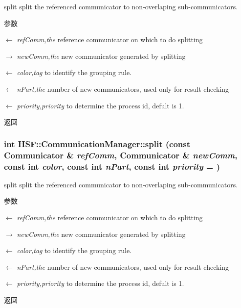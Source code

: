 split split the referenced communicator to non-\/overlaping sub-\/communicators. 
\begin{DoxyParams}{参数}
\item[\mbox{$\leftarrow$} {\em refComm,the}]reference communicator on which to do splitting \item[\mbox{$\rightarrow$} {\em newComm,the}]new communicator generated by splitting \item[\mbox{$\leftarrow$} {\em color,tag}]to identify the grouping rule. \item[\mbox{$\leftarrow$} {\em nPart,the}]number of new communicators, used only for result checking \item[\mbox{$\leftarrow$} {\em priority,priority}]to determine the process id, defult is 1. \end{DoxyParams}
\begin{DoxyReturn}{返回}

\end{DoxyReturn}
\hypertarget{classHSF_1_1CommunicationManager_ac7894dbdde04977f11fdbe954641d28e}{
\subsubsection[{split}]{\setlength{\rightskip}{0pt plus 5cm}int HSF::CommunicationManager::split (const {\bf Communicator} \& {\em refComm}, \/  {\bf Communicator} \& {\em newComm}, \/  const int {\em color}, \/  const int {\em nPart}, \/  const int {\em priority} = {})}}
\label{classHSF_1_1CommunicationManager_ac7894dbdde04977f11fdbe954641d28e}


split split the referenced communicator to non-\/overlaping sub-\/communicators. 
\begin{DoxyParams}{参数}
\item[\mbox{$\leftarrow$} {\em refComm,the}]reference communicator on which to do splitting \item[\mbox{$\rightarrow$} {\em newComm,the}]new communicator generated by splitting \item[\mbox{$\leftarrow$} {\em color,tag}]to identify the grouping rule. \item[\mbox{$\leftarrow$} {\em nPart,the}]number of new communicators, used only for result checking \item[\mbox{$\leftarrow$} {\em priority,priority}]to determine the process id, defult is 1. \end{DoxyParams}
\begin{DoxyReturn}{返回}

\end{DoxyReturn}


